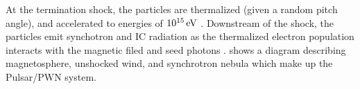 At the termination shock, the particles are thermalized
(given a random pitch angle), and accelerated to energies of
$10^{15}\,\text{eV}$ \citep{arons_1996_pulsars-gamma-rays}.
Downstream of the shock, the particles emit synchotron and \ac{IC}
radiation as the thermalized electron population interacts with the
magnetic filed and seed photons \citep{gaensler_2006_evolution-structure}.
 shows a diagram describing magnetosphere,
unshocked wind, and synchrotron nebula which make up the Pulsar/\ac{PWN}
system.


